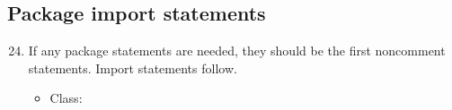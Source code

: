 \subsection{Package import statements}
\begin{enumerate}
\setcounter{enumi}{23}
	\item If any package statements are needed, they should be the first noncomment statements. Import statements follow.
	\begin{itemize}
	 	\item Class: \cmark
	\end{itemize}	
\end{enumerate}